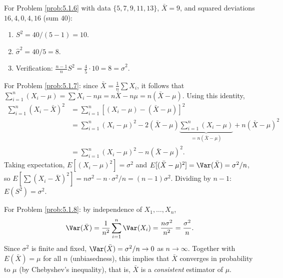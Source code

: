 \begin{solucion}
	\label{sol:5.1.6}
	For Problem \ref{prob:5.1.6} with data $\{5,7,9,11,13\}$, $\bar{X}=9$, and squared deviations $16,4,0,4,16$ (sum $40$):
	\begin{enumerate}
		\item $S^{2} = 40/(5-1) = 10$.
		\item $\hat{\sigma}^{2} = 40/5 = 8$.
		\item Verification: $\frac{n-1}{n}S^{2} = \frac{4}{5}\cdot 10 = 8 = \hat{\sigma}^{2}$. \quad \qedhere
	\end{enumerate}
\end{solucion}

\begin{solucion}
	\label{sol:5.1.7}
	For Problem \ref{prob:5.1.7}: since $\bar{X}=\frac{1}{n}\sum X_i$, it follows that $\sum_{i=1}^n(X_i-\mu) = \sum X_i - n\mu = n\bar{X}-n\mu = n(\bar{X}-\mu)$. Using this identity,
	\begin{align*}
		\sum_{i=1}^n(X_i-\bar X)^2 &= \sum_{i=1}^n\left[(X_i-\mu)-(\bar X-\mu)\right]^2 \\
		&= \sum_{i=1}^n(X_i-\mu)^2 - 2(\bar X-\mu)\underbrace{\sum_{i=1}^n(X_i-\mu)}_{=n(\bar X-\mu)} + n(\bar X-\mu)^2 \\
		&= \sum_{i=1}^n(X_i-\mu)^2 - n(\bar X-\mu)^2.
	\end{align*}
	Taking expectation, $E[(X_i-\mu)^2]=\sigma^2$ and $E[(\bar X-\mu)^2]=\Var(\bar X)=\sigma^2/n$, so $E\left[\sum(X_i-\bar X)^2\right] = n\sigma^2 - n\cdot\sigma^2/n = (n-1)\sigma^2$. Dividing by $n-1$: $E(S^2)=\sigma^2$. \quad \qedhere
\end{solucion}

\begin{solucion}
	\label{sol:5.1.8}
	For Problem \ref{prob:5.1.8}: by independence of $X_1,\ldots,X_n$,
	\begin{align*}
		\Var(\bar X) = \frac{1}{n^2}\sum_{i=1}^n \Var(X_i) = \frac{n\sigma^2}{n^2} = \frac{\sigma^2}{n}.
	\end{align*}
	Since $\sigma^2$ is finite and fixed, $\Var(\bar X) = \sigma^2/n \to 0$ as $n\to\infty$. Together with $E(\bar X)=\mu$ for all $n$ (unbiasedness), this implies that $\bar X$ converges in probability to $\mu$ (by Chebyshev's inequality), that is, $\bar X$ is a \emph{consistent} estimator of $\mu$. \quad \qedhere
\end{solucion}

